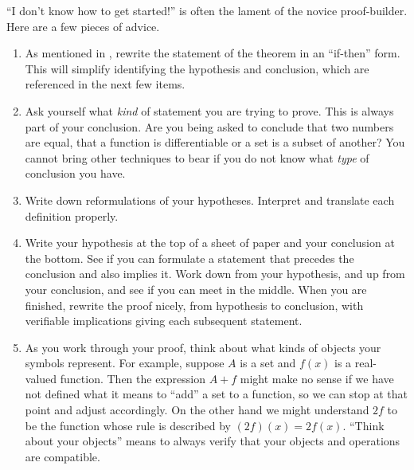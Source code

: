 \begin{para}``I don't know how to get started!'' is often the lament of the novice proof-builder.  Here are a few pieces of advice.
%
\begin{enumerate}
%
\item  As mentioned in , rewrite the statement of the theorem in an ``if-then'' form.  This will simplify identifying the hypothesis and conclusion, which are referenced in the next few items.
%
\item  Ask yourself what {\em kind} of statement you are trying to prove.  This is always part of your conclusion.  Are you being asked to conclude that two numbers are equal, that a function is differentiable or a set is a subset of another?  You cannot bring other techniques to bear if you do not know what {\em type} of conclusion you have.
%
\item  Write down reformulations of your hypotheses.  Interpret and translate each definition properly.
%
\item Write your hypothesis at the top of a sheet of paper and your conclusion at the bottom.  See if you can formulate a statement that precedes the conclusion and also implies it.  Work down from your hypothesis, and up from your conclusion, and see if you can meet in the middle.  When you are finished, rewrite the proof nicely, from hypothesis to conclusion, with verifiable implications giving each subsequent statement.
%
\item As you work through your proof, think about what kinds of objects your symbols represent.  For example, suppose $A$ is a set and $f(x)$ is a real-valued function.  Then the expression $A+f$ might make no sense if we have not defined what it means to ``add'' a set to a function, so we can stop at that point and adjust accordingly.  On the other hand we might understand $2f$ to be the function whose rule is described by $(2f)(x)=2f(x)$.  ``Think about your objects'' means to always verify that your objects and operations are compatible.
%
\end{enumerate}
\end{para}
